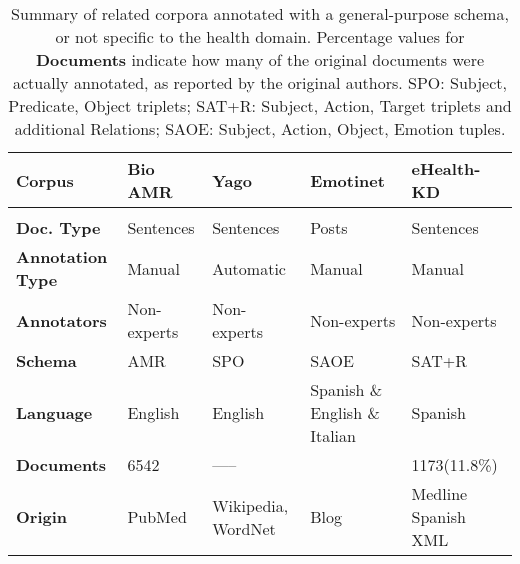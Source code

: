 \begin{table}[h!]\centering
  \footnotesize{
    \begin{tabularx}{\hsize}{X|XXXX}
      \hline
      \hline
      \textbf{Corpus}          & \textbf{Bio AMR} & \textbf{Yago}      & \textbf{Emotinet}             & \textbf{eHealth-KD} \\
      \hline                                                                                                                 \\
      \textbf{Doc. Type}       & Sentences        & Sentences          & Posts                         & Sentences           \\
      \textbf{Annotation Type} & Manual           & Automatic          & Manual                        & Manual              \\
      \textbf{Annotators}      & Non-experts      & Non-experts        & Non-experts                   & Non-experts         \\
      \textbf{Schema}          & AMR              & {SPO}              & {SAOE}                        & {SAT+R}             \\ %
      \textbf{Language}        & English          & English            & Spanish \& English \& Italian & Spanish             \\
      \textbf{Documents}       & 6542             & -----              &                               & 1173(11.8\%)        \\
      \textbf{Origin}          & PubMed           & Wikipedia, WordNet & Blog                          & Medline Spanish XML \\
      \hline
      \hline
    \end{tabularx}
  }
  \caption{Summary of related corpora annotated with a general-purpose schema, or not specific to the health domain.
      {Percentage values for \textbf{Documents} indicate how many of the original documents were actually annotated, as reported by the original authors. SPO: Subject, Predicate, Object triplets; SAT+R: Subject, Action, Target triplets and additional Relations; SAOE:  Subject, Action, Object, Emotion tuples.}
    \label{tab:stateofart2}}
\end{table}

